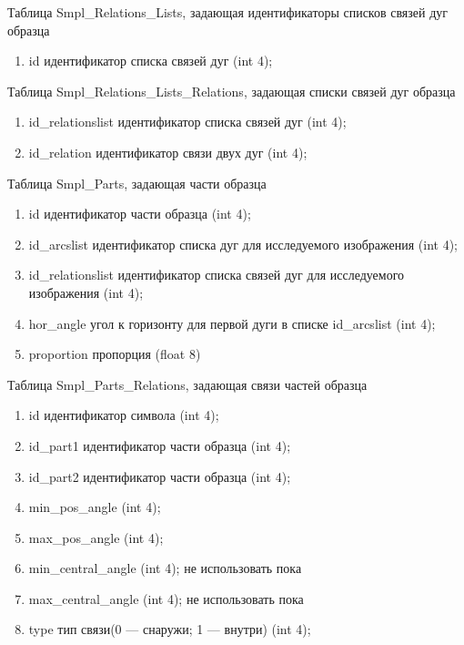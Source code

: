 \noindent 
Таблица Smpl\_Relations\_Lists, задающая идентификаторы списков связей дуг образца
\small
\begin{enumerate}
\item id		       	идентификатор списка связей дуг (int 4);
\end{enumerate}
\normalsize

\noindent 
Таблица Smpl\_Relations\_Lists\_Relations, задающая списки связей дуг образца
\small
\begin{enumerate}
\item id\_relationslist	идентификатор списка связей дуг (int 4);
\item id\_relation		идентификатор связи двух дуг (int 4);
\end{enumerate}
\normalsize


\noindent 
Таблица Smpl\_Parts, задающая части образца
\small
\begin{enumerate}
\item id			идентификатор части образца (int 4);
\item id\_arcslist		идентификатор списка дуг для исследуемого изображения (int 4);
\item id\_relationslist	идентификатор списка связей дуг для исследуемого изображения (int 4);
\item hor\_angle		угол к горизонту для первой дуги в списке id\_arcslist (int 4);
\item proportion		пропорция (float 8)
\end{enumerate}	
\normalsize


\noindent 
Таблица Smpl\_Parts\_Relations, задающая связи частей образца
\small
\begin{enumerate}
\item id			              идентификатор символа (int 4);
\item id\_part1                		идентификатор части образца (int 4);
\item id\_part2                 		идентификатор части образца (int 4);
\item min\_pos\_angle		(int 4);
\item max\_pos\_angle		(int 4);
\item min\_central\_angle	(int 4); не использовать пока
\item max\_central\_angle	(int 4); не использовать пока
\item type				тип связи(0 — снаружи; 1 — внутри) (int 4);
\end{enumerate}
\normalsize


